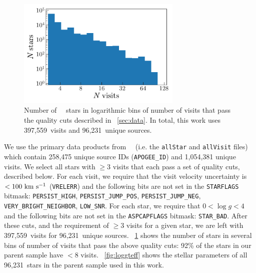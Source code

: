 \documentclass[modern, letterpaper]{aastex62}
\newcommand{\apogee}{\project{\acronym{APOGEE}}}
\newcommand{\DR}{\acronym{DR14}}
\newcommand{\nstars}{96,231}
\newcommand{\nvisits}{397,559}
\begin{document}
\begin{figure}[h]
\begin{center}
\includegraphics[width=0.7\textwidth]{nvisits.pdf}
\end{center}
\caption{%
Number of \apogee\ \DR\ stars in logarithmic bins of number of visits that pass
the quality cuts described in \sectionname~\ref{sec:data}.
In total, this work uses \nvisits\ visits and \nstars\ unique sources.
\label{fig:nvisits}
}
\end{figure}

We use the primary data products from \apogee\ \DR\ (i.e. the \texttt{allStar}
and \texttt{allVisit} files) which contain 258,475 unique source IDs
(\texttt{APOGEE\_ID}) and 1,054,381 unique visits.
We select all stars with $\geq 3$ visits that each pass a set of quality cuts,
described below.
For each visit, we require that the visit velocity uncertainty is $< 100~\mathrm{km}~\mathrm{s}^{-1}$
(\texttt{VRELERR}) and the following bits are not set in the \texttt{STARFLAGS}
bitmask: \texttt{PERSIST\_HIGH}, \texttt{PERSIST\_JUMP\_POS},
\texttt{PERSIST\_JUMP\_NEG}, \texttt{VERY\_BRIGHT\_NEIGHBOR}, \texttt{LOW\_SNR}.
For each star, we require that $0 < \log g < 4$ and the following bits are not
set in the \texttt{ASPCAPFLAGS} bitmask: \texttt{STAR\_BAD}.
After these cuts, and the requirement of $\geq 3$ visits for a given star, we
are left with \nvisits\ visits for \nstars\ unique sources.
\figurename~\ref{fig:nvisits} shows the number of stars in several bins of
number of visits that pass the above quality cuts: 92\% of the stars in
our parent sample have $< 8$ visits.
\figurename~\ref{fig:loggteff} shows the stellar parameters of all \nstars\
stars in the parent sample used in this work.
\end{document}
